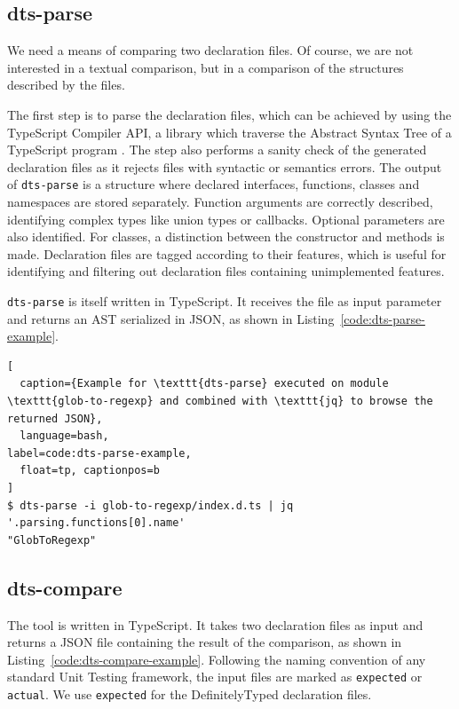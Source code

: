 \documentclass[english,cleveref,autoref,submission]{programming}
\newcommand{\coderef}[1]{Listing~\ref{#1}}
\begin{document}
\subsection{dts-parse}
\label{sec:dts-parse}
We need a means of comparing two declaration files. Of
course, we are not interested in a textual comparison, but in a
comparison of the structures described by the files.

The first step is to parse the declaration files, which can be
achieved by using the TypeScript Compiler API, a library which traverse the
Abstract Syntax Tree of a TypeScript program
\cite{typescript-compiler-api}. 
The step also performs a sanity check of the generated declaration
files as it rejects files with syntactic or semantics errors.
The output of \texttt{dts-parse} is a structure where declared
{interfaces}, {functions}, {classes} and
{namespaces} are stored separately. Function arguments are
correctly described, identifying complex types like union types or
callbacks. Optional parameters are also identified. For
{classes}, a distinction between the constructor and methods
is made. Declaration files are tagged according to their features, which is useful for identifying and filtering out declaration files containing unimplemented features.

\texttt{dts-parse} is itself written in TypeScript. It receives the file as input
parameter and returns an AST serialized in JSON, as shown in \coderef{code:dts-parse-example}.

\begin{lstlisting}[
  caption={Example for \texttt{dts-parse} executed on module \texttt{glob-to-regexp} and combined with \texttt{jq} to browse the returned JSON},
  language=bash,
label=code:dts-parse-example,
  float=tp, captionpos=b
]
$ dts-parse -i glob-to-regexp/index.d.ts | jq '.parsing.functions[0].name'
"GlobToRegexp"
\end{lstlisting} %

\subsection{dts-compare}
\label{sec:dts-compare}
The tool is written in TypeScript. It takes two declaration files as input and returns a
JSON file containing the result of the comparison, as shown in
\coderef{code:dts-compare-example}. Following the naming convention of any standard Unit
Testing framework, the input files are marked as \lstinline{expected} or
\lstinline{actual}. We use \lstinline{expected} for the DefinitelyTyped
declaration files. 
\end{document}
